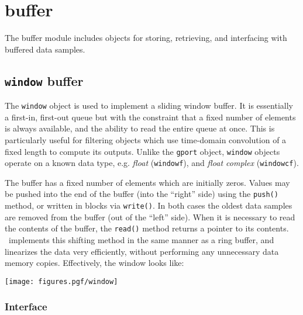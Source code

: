 % 
%

\newpage
\section{buffer}
\label{module:buffer}
The buffer module includes objects for storing, retrieving, and
interfacing with buffered data samples.


\subsection{{\tt window} buffer}
\label{module:buffer:window}
The {\tt window} object is used to implement a sliding window buffer.
It is essentially a first-in, first-out queue but with the constraint that a
fixed number of elements is always available, and the ability to read the
entire queue at once.
This is particularly useful for filtering objects which use time-domain
convolution of a fixed length to compute its outputs.
Unlike the {\tt gport} object, {\tt window} objects operate on a known data
type, e.g.
{\it float} ({\tt windowf}), and
{\it float complex} ({\tt windowcf}).

The buffer has a fixed number of elements which are initially zeros.
Values may be pushed into the end of the buffer (into the ``right'' side)
using the {\tt push()} method, or written in blocks via {\tt write()}.
In both cases the oldest data samples are removed from the buffer (out of the
``left'' side).
When it is necessary to read the contents of the buffer, the {\tt read()}
method returns a pointer to its contents.
\liquid\ implements this shifting method in the same manner as a ring buffer,
and linearizes the data very efficiently, without performing any unnecessary
data memory copies.
Effectively, the window looks like:

\begin{centering}
\texttt{[image: figures.pgf/window]}
\end{centering}

\subsubsection{Interface}
\label{module:buffer:window:interface}

